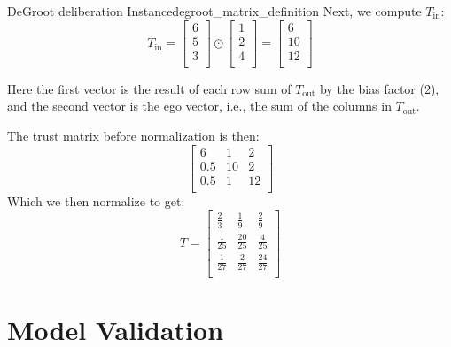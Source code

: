 \begin{example}{DeGroot deliberation Instance}{degroot_matrix_definition}
	Next, we compute $T_{\text{in}}$:
	$$T_{\text{in}} = \begin{bmatrix}
			6 \\
			5 \\
			3 \\
		\end{bmatrix} \odot
		\begin{bmatrix}
			1 \\
			2 \\
			4 \\
		\end{bmatrix} = \begin{bmatrix}
			6  \\
			10 \\
			12 \\
		\end{bmatrix} $$

	Here the first vector is the result of each row sum of $T_{\text{out}}$ by the bias factor (2), and the second vector is the ego vector, i.e., the sum of the columns in $T_{\text{out}}$.

	The trust matrix before normalization is then:
	$$\begin{bmatrix}
			6   & 1  & 2  \\
			0.5 & 10 & 2  \\
			0.5 & 1  & 12 \\
		\end{bmatrix}$$
	Which we then normalize to get:
	$$T = \begin{bmatrix}
			\frac{2}{3}  & \frac{1}{9}   & \frac{2}{9}   \\
			\frac{1}{25} & \frac{20}{25} & \frac{4}{25}  \\
			\frac{1}{27} & \frac{2}{27}  & \frac{24}{27} \\
		\end{bmatrix}
	$$
\end{example}



\section{Model Validation}

